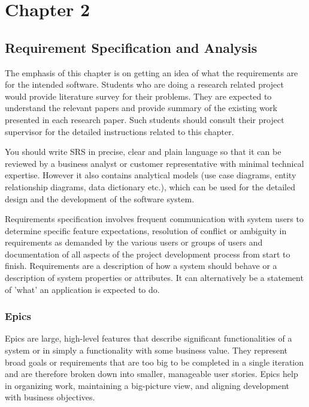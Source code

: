 


\setcounter{chapter}{2}
\setcounter{figure}{0}
\setcounter{table}{0}
\chapter*{Chapter 2}
\section{Requirement Specification and Analysis}

The emphasis of this chapter is on getting an idea of what the requirements are for the intended software. Students who are doing a research related project would provide literature survey for their problems. They are expected to understand the relevant papers and provide summary of the existing work presented in each research paper. Such students should consult their project supervisor for the detailed instructions related to this chapter.

You should write SRS in precise, clear and plain language so that it can be reviewed by a business analyst or customer representative with minimal technical expertise. However it also contains analytical models (use case diagrams, entity relationship diagrams, data dictionary etc.), which can be used for the detailed design and the development of the software system.

Requirements specification involves frequent communication with system users to determine specific feature expectations, resolution of conflict or ambiguity in requirements as demanded by the various users or groups of users and documentation of all aspects of the project development process from start to finish. Requirements are a description of how a system should behave or a description of system properties or attributes. It can alternatively be a statement of 'what' an application is expected to do.

\subsection{Epics}

Epics are large, high-level features that describe significant functionalities of a system or in simply a functionality with some business value. They represent broad goals or requirements that are too big to be completed in a single iteration and are therefore broken down into smaller, manageable user stories. Epics help in organizing work, maintaining a big-picture view, and aligning development with business objectives.

